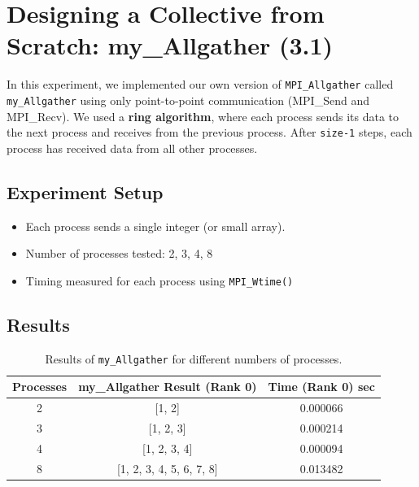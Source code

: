 \documentclass[a4paper,12pt]{article}
\begin{document}
\section{Designing a Collective from Scratch: my\_Allgather (3.1)}

In this experiment, we implemented our own version of \texttt{MPI\_Allgather} called \texttt{my\_Allgather} using only point-to-point communication (MPI\_Send and MPI\_Recv). We used a \textbf{ring algorithm}, where each process sends its data to the next process and receives from the previous process. After \texttt{size-1} steps, each process has received data from all other processes.

\subsection{Experiment Setup}
\begin{itemize}
    \item Each process sends a single integer (or small array).
    \item Number of processes tested: 2, 3, 4, 8
    \item Timing measured for each process using \texttt{MPI\_Wtime()}
\end{itemize}

\subsection{Results}
\begin{table}[h!]
\centering
\begin{tabular}{|c|c|c|}
\hline
\textbf{Processes} & \textbf{my\_Allgather Result (Rank 0)} & \textbf{Time (Rank 0) sec} \\
\hline
2 & [1, 2] & 0.000066 \\
3 & [1, 2, 3] & 0.000214 \\
4 & [1, 2, 3, 4] & 0.000094 \\
8 & [1, 2, 3, 4, 5, 6, 7, 8] & 0.013482 \\
\hline
\end{tabular}
\caption{Results of \texttt{my\_Allgather} for different numbers of processes.}
\end{table}
\end{document}
